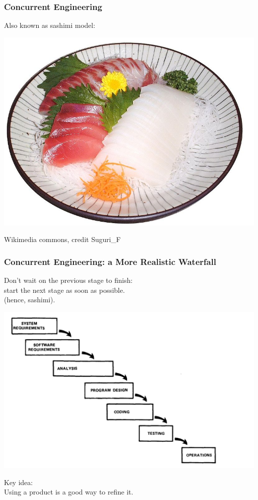 \begin{frame}
\frametitle{Concurrent Engineering}


Also known as sashimi model:
\begin{center}
\includegraphics[height=.7\textheight]{images/800px-Sashimi}
\end{center}
{\hfill \scriptsize Wikimedia commons, credit Suguri\_F}

\end{frame}

\begin{frame}
\frametitle{Concurrent Engineering: a More Realistic Waterfall}

\begin{changemargin}{1cm}
Don't wait on the previous stage to finish:\\
start the next stage as soon as possible.\\
\qquad (hence, sashimi).

\begin{center}
\includegraphics[height=.6\textheight]{images/concurrent-engineering}
\end{center}

Key idea: \\
Using a product is a good way to refine it.

\end{changemargin}
\end{frame}

